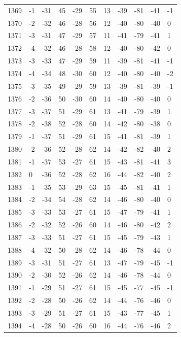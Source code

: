 \begin{table}[H]
\begin{tabular}{lllllllllll}
1369 & -1 & -31 & 45 & -29 & 55 & 13 & -39 & -81 & -41 & -1 \\
1370 & -2 & -32 & 46 & -28 & 56 & 12 & -40 & -80 & -40 & 0 \\
1371 & -3 & -31 & 47 & -29 & 57 & 11 & -41 & -79 & -41 & 1 \\
1372 & -4 & -32 & 46 & -28 & 58 & 12 & -40 & -80 & -42 & 0 \\
1373 & -3 & -33 & 47 & -29 & 59 & 11 & -39 & -81 & -41 & -1 \\
1374 & -4 & -34 & 48 & -30 & 60 & 12 & -40 & -80 & -40 & -2 \\
1375 & -3 & -35 & 49 & -29 & 59 & 13 & -39 & -81 & -39 & -1 \\
1376 & -2 & -36 & 50 & -30 & 60 & 14 & -40 & -80 & -40 & 0 \\
1377 & -3 & -37 & 51 & -29 & 61 & 13 & -41 & -79 & -39 & 1 \\
1378 & -2 & -38 & 52 & -28 & 60 & 14 & -42 & -80 & -38 & 0 \\
1379 & -1 & -37 & 51 & -29 & 61 & 15 & -41 & -81 & -39 & 1 \\
1380 & -2 & -36 & 52 & -28 & 62 & 14 & -42 & -82 & -40 & 2 \\
1381 & -1 & -37 & 53 & -27 & 61 & 15 & -43 & -81 & -41 & 3 \\
1382 & 0 & -36 & 52 & -28 & 62 & 16 & -44 & -82 & -40 & 2 \\
1383 & -1 & -35 & 53 & -29 & 63 & 15 & -45 & -81 & -41 & 1 \\
1384 & -2 & -34 & 54 & -28 & 62 & 14 & -46 & -80 & -40 & 0 \\
1385 & -3 & -33 & 53 & -27 & 61 & 15 & -47 & -79 & -41 & 1 \\
1386 & -2 & -32 & 52 & -26 & 60 & 14 & -46 & -80 & -42 & 2 \\
1387 & -3 & -33 & 51 & -27 & 61 & 15 & -45 & -79 & -43 & 1 \\
1388 & -4 & -32 & 50 & -28 & 62 & 14 & -46 & -78 & -44 & 0 \\
1389 & -3 & -31 & 51 & -27 & 61 & 13 & -47 & -79 & -45 & -1 \\
1390 & -2 & -30 & 52 & -26 & 62 & 14 & -46 & -78 & -44 & 0 \\
1391 & -1 & -29 & 51 & -27 & 61 & 15 & -45 & -77 & -45 & -1 \\
1392 & -2 & -28 & 50 & -26 & 62 & 14 & -44 & -76 & -46 & 0 \\
1393 & -3 & -29 & 51 & -27 & 61 & 15 & -43 & -77 & -45 & 1 \\
1394 & -4 & -28 & 50 & -26 & 60 & 16 & -44 & -76 & -46 & 2 \\

\end{tabular}
\end{table}
